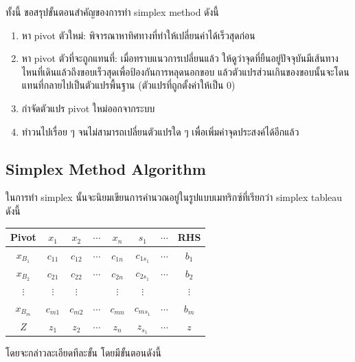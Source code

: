 ทั้งนี้ ขอสรุปขั้นตอนสำคัญของการทำ simplex method ดังนี้
\begin{enumerate}
    \item หา pivot ตัวใหม่: พิจารณาหาทิศทางที่ทำให้เปลี่ยนค่าได้เร็วสุดก่อน
    \item หา pivot ตัวที่จะถูกแทนที่: เมื่อทราบแนวการเปลี่ยนแล้ว ให้ดูว่าจุดที่ยืนอยู่ปัจจุบันมีเส้นทางไหนที่เดินแล้วถึงขอบเร็วสุดเพื่อป้องกันการหลุดนอกขอบ แล้วตัวแปรส่วนเกินของขอบนั้นจะโดนแทนที่กลายไปเป็นตัวแปรพื้นฐาน (ตัวแปรที่ถูกตั้งค่าให้เป็น 0)
    \item กำจัดตัวแปร pivot ใหม่ออกจากระบบ
    \item ทำวนไปเรื่อย ๆ จนไม่สามารถเปลี่ยนตัวแปรใด ๆ เพื่อเพิ่มค่าจุดประสงค์ได้อีกแล้ว
\end{enumerate}

\subsection{Simplex Method Algorithm}
ในการทำ simplex นั้นจะนิยมเขียนการคำนวณอยู่ในรูปแบบเมทริกซ์ที่เรียกว่า simplex tableau ดังนี้
\begin{center}
\renewcommand{\arraystretch}{1.4}
\begin{tabular}{|c|cccccc|c|}
\hline
\textbf{Pivot} & $x_1$ & $x_2$ & $\cdots$ & $x_n$ & $s_1$ & $\cdots$ & \textbf{RHS} \\
\hline
$x_{B_1}$ & $c_{11}$ & $c_{12}$ & $\cdots$ & $c_{1n}$ & $c_{1s_1}$ & $\cdots$ & $b_1$ \\
$x_{B_2}$ & $c_{21}$ & $c_{22}$ & $\cdots$ & $c_{2n}$ & $c_{2s_1}$ & $\cdots$ & $b_2$ \\
$\vdots$ & $\vdots$ & $\vdots$ & & $\vdots$ & $\vdots$ & & $\vdots$ \\
$x_{B_m}$ & $c_{m1}$ & $c_{m2}$ & $\cdots$ & $c_{mn}$ & $c_{ms_1}$ & $\cdots$ & $b_m$ \\
\hline
$Z$ & $z_1$ & $z_2$ & $\cdots$ & $z_n$ & $z_{s_1}$ & $\cdots$ & $z$ \\
\hline
\end{tabular}
\end{center}
โดยจะกล่าวละเอียดทีละขั้น โดยมีขั้นตอนดังนี้

